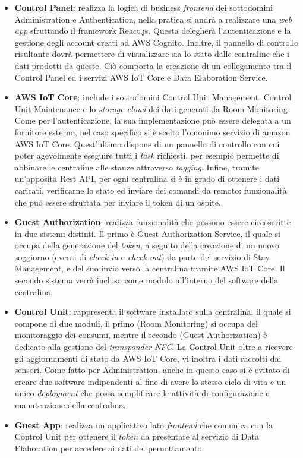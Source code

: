 \begin{itemize}
    \item \textbf{Control Panel}: realizza la logica di business \textit{frontend} dei sottodomini Administration e Authentication, nella pratica si andrà a realizzare una \textit{web app} sfruttando il framework React.js. Questa delegherà l'autenticazione e la gestione degli account creati ad AWS Cognito. Inoltre, il pannello di controllo risultante dovrà permettere di visualizzare sia lo stato dalle centraline che i dati prodotti da queste. Ciò comporta la creazione di un collegamento tra il Control Panel ed i servizi AWS IoT Core e Data Elaboration Service.
    \item \textbf{AWS IoT Core}: include i sottodomini Control Unit Management, Control Unit Maintenance e lo \textit{storage cloud} dei dati generati da Room Monitoring. Come per l'autenticazione, la sua implementazione può essere delegata a un fornitore esterno, nel caso specifico si è scelto l'omonimo servizio di amazon AWS IoT Core. Quest'ultimo dispone di un pannello di controllo con cui poter agevolmente eseguire tutti i \textit{task} richiesti, per esempio permette di abbinare le centraline alle stanze attraverso \textit{tagging}. Infine, tramite un'apposita Rest API, per ogni centralina si è in grado di ottenere i dati caricati, verificarne lo stato ed inviare dei comandi da remoto: funzionalità che può essere sfruttata per inviare il token di un ospite.
    \item \textbf{Guest Authorization}: realizza funzionalità che possono essere circoscritte in due sistemi distinti. Il primo è Guest Authorization Service, il quale si occupa della generazione del \textit{token}, a seguito della creazione di un nuovo soggiorno (eventi di \textit{check in} e \textit{check out}) da parte del servizio di Stay Management, e del suo invio verso la centralina tramite AWS IoT Core. Il secondo sistema verrà incluso come modulo all'interno del software della centralina.
    \item \textbf{Control Unit}: rappresenta il software installato sulla centralina, il quale si compone di due moduli, il primo (Room Monitoring) si occupa del monitoraggio dei consumi, mentre il secondo (Guest Authorization) è dedicato alla gestione del \textit{transponder NFC}. La Control Unit oltre a ricevere gli aggiornamenti di stato da AWS IoT Core, vi inoltra i dati raccolti dai sensori. Come fatto per Administration, anche in questo caso si è evitato di creare due software indipendenti al fine di avere lo stesso ciclo di vita e un unico \textit{deployment} che possa semplificare le attività di configurazione e manutenzione della centralina.
    \item \textbf{Guest App}: realizza un applicativo lato \textit{frontend} che comunica con la Control Unit per ottenere il \textit{token} da presentare al servizio di Data Elaboration per accedere ai dati del pernottamento.
\end{itemize}

